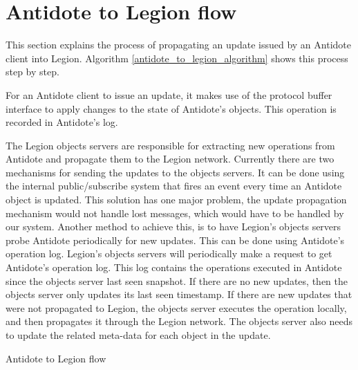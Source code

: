 \section{Antidote to Legion flow}
\label{sec:antidote_to_legion_flow}
This section explains the process of propagating an update issued by an Antidote client into Legion. Algorithm \ref{antidote_to_legion_algorithm} shows this process step by step.\par
	For an Antidote client to issue an update, it makes use of the protocol buffer interface\cite{protocol_buffers} to apply changes to the state of Antidote's objects. This operation is recorded in Antidote's log.\par
	The Legion objects servers are responsible for extracting new operations from Antidote and propagate them to the Legion network. Currently there are two mechanisms for sending the updates to the objects servers. It can be done using the internal public/subscribe system that fires an event every time an Antidote object is updated. This solution has one major problem, the update propagation mechanism would not handle lost messages, which would have to be handled by our system.
	Another method to achieve this, is to have Legion's objects servers probe Antidote periodically for new updates. This can be done using Antidote's operation log. Legion's objects servers will periodically make a request to get Antidote's operation log. This log contains the operations executed in Antidote since the objects server last seen snapshot. If there are no new updates, then the objects server only updates its last seen timestamp. If there are new updates that were not propagated to Legion, the objects server executes the operation locally, and then propagates it through the Legion network. The objects server also needs to update the related meta-data for each object in the update.
	
\begin{algorithm}
\caption{Antidote to Legion flow}
\label{antidote_to_legion_algorithm}
\begin{algorithmic}[1]
          \Else {}
          \EndIf
      \EndIf
    \EndFor
  \End
\end{algorithmic}
\end{algorithm}